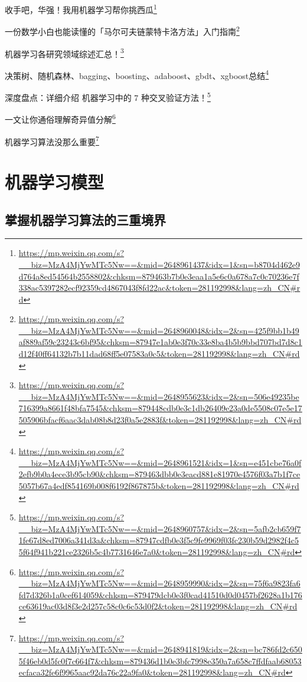 \documentclass[]{ctexbook}
\renewcommand{\href}[2]{#2\footnote{\url{#1}}}
\begin{document}
\href{https://mp.weixin.qq.com/s?__biz=MzA4MjYwMTc5Nw==\&mid=2648961437\&idx=1\&sn=b8704d462e9d764a8ed54564b2558802\&chksm=879463b7b0e3eaa1a5e6c0a678a7c0c70236e7f338ac5397282ecf92359cd4867043f8fd22ac\&token=281192998\&lang=zh_CN\#rd}{收手吧，华强！我用机器学习帮你挑西瓜}

\href{https://mp.weixin.qq.com/s?__biz=MzA4MjYwMTc5Nw==\&mid=2648960048\&idx=2\&sn=425f9bb1b49af889af59c23243c6bf95\&chksm=87947e1ab0e3f70c33e8ba4b5b9bbd707bd7d8c1d12f40ff64132b7b11dad68ff5e07583a0c5\&token=281192998\&lang=zh_CN\#rd}{一份数学小白也能读懂的「马尔可夫链蒙特卡洛方法」入门指南}

\href{https://mp.weixin.qq.com/s?__biz=MzA4MjYwMTc5Nw==\&mid=2648955623\&idx=2\&sn=506e49235be716399a8661f48bfa7545\&chksm=879448cdb0e3c1db26409e23a0de5508c07e5e17505906bfacf6aac3dab08b8d23f0a5e2883f\&token=281192998\&lang=zh_CN\#rd}{机器学习各研究领域综述汇总！}

\href{https://mp.weixin.qq.com/s?__biz=MzA4MjYwMTc5Nw==\&mid=2648961521\&idx=1\&sn=e451cbe76a0f2efb9b0a4ece3b95cb90\&chksm=879463dbb0e3eacd881e81970e4576f03a7b1f7ce5057b67a4edf854169b008f6192f867875b\&token=281192998\&lang=zh_CN\#rd}{决策树、随机森林、bagging、boosting、adaboost、gbdt、xgboost总结}

\href{https://mp.weixin.qq.com/s?__biz=MzA4MjYwMTc5Nw==\&mid=2648960757\&idx=2\&sn=5afb2cb659f71fe67d8ed7006a341d3a\&chksm=87947cdfb0e3f5c9fe9969f03fc230b59d2982f4c55f64f941b221ce2326b5c4b7731646e7a0\&token=281192998\&lang=zh_CN\#rd}{深度盘点：详细介绍 机器学习中的 7 种交叉验证方法！}

\href{https://mp.weixin.qq.com/s?__biz=MzA4MjYwMTc5Nw==\&mid=2648959990\&idx=2\&sn=75f6a9823fa6fd7d326b1a0cef614059\&chksm=879479dcb0e3f0cad41510d0d0457bf2628a1b176ce63619ac03d8f3e2d257c58c0c6c53d0f2\&token=281192998\&lang=zh_CN\#rd}{一文让你通俗理解奇异值分解}

\href{https://mp.weixin.qq.com/s?__biz=MzA4MjYwMTc5Nw==\&mid=2648941819\&idx=2\&sn=bc786fd2c6505f46eb0d5fc0f7c664f7\&chksm=879436d1b0e3bfc7998e350a7a658c7ffdfaab68053ecfaca32fe6f9965aac92da76c22a9fa0\&token=281192998\&lang=zh_CN\#rd}{机器学习算法没那么重要}

\hypertarget{ux673aux5668ux5b66ux4e60ux6a21ux578b}{%
\chapter{机器学习模型}\label{ux673aux5668ux5b66ux4e60ux6a21ux578b}}

\hypertarget{ux638cux63e1ux673aux5668ux5b66ux4e60ux7b97ux6cd5ux7684ux4e09ux91cdux5883ux754c}{%
\section{掌握机器学习算法的三重境界}\label{ux638cux63e1ux673aux5668ux5b66ux4e60ux7b97ux6cd5ux7684ux4e09ux91cdux5883ux754c}}
\end{document}
